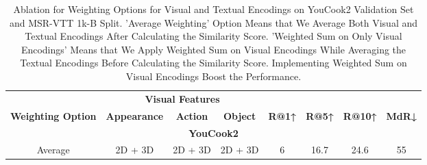 \documentclass[lettersize,journal]{IEEEtran}
\begin{document}
\begin{table*}[!htb]
\centering
\caption{Ablation for Weighting Options for Visual and Textual Encodings on YouCook2 Validation Set and MSR-VTT 1k-B Split. 'Average Weighting' Option Means that We Average Both Visual and Textual Encodings After Calculating the Similarity Score. 'Weighted Sum on Only Visual Encodings' Means that We Apply Weighted Sum on Visual Encodings While Averaging the Textual Encodings Before Calculating the Similarity Score. Implementing Weighted Sum on Visual Encodings Boost the Performance.}
\label{tab:abl-weight}
\begin{tabular}{|cccccccc|}
\hline
\multicolumn{1}{|c|}{}                                                                                             & \multicolumn{3}{c|}{\textbf{Visual  Features}}                                                                         & \multicolumn{1}{c|}{}                                & \multicolumn{1}{c|}{}                                & \multicolumn{1}{c|}{}                                 &                                 \\ \cline{2-4}
\multicolumn{1}{|c|}{\multirow{-2}{*}{\textbf{Weighting Option}}}                                                  & \multicolumn{1}{c|}{\textbf{Appearance}} & \multicolumn{1}{c|}{\textbf{Action}} & \multicolumn{1}{c|}{\textbf{Object}} & \multicolumn{1}{c|}{\multirow{-2}{*}{\textbf{R@1↑}}} & \multicolumn{1}{c|}{\multirow{-2}{*}{\textbf{R@5↑}}} & \multicolumn{1}{c|}{\multirow{-2}{*}{\textbf{R@10↑}}} & \multirow{-2}{*}{\textbf{MdR↓}} \\ \hline \hline
\multicolumn{8}{|c|}{\cellcolor[HTML]{EFEFEF}\textbf{YouCook2}}                                                                                                                                                                                                                                                                                                                                                                                     \\ \hline
\multicolumn{1}{|c|}{Average}                                                                                      & \multicolumn{1}{c|}{2D + 3D}             & \multicolumn{1}{c|}{2D + 3D}         & \multicolumn{1}{c|}{2D + 3D}         & \multicolumn{1}{c|}{6}                               & \multicolumn{1}{c|}{16.7}                            & \multicolumn{1}{c|}{24.6}                             & 55                              \\ \hline

\end{tabular}
\end{table*}
\end{document}
